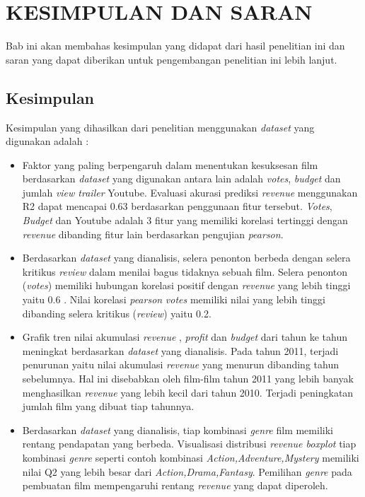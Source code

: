 \chapter{KESIMPULAN DAN SARAN}
\label{chap:kesimpulan}

Bab ini akan membahas kesimpulan yang didapat dari hasil penelitian ini dan saran yang dapat diberikan untuk pengembangan penelitian ini lebih lanjut.

\section{Kesimpulan}
Kesimpulan yang dihasilkan dari penelitian menggunakan \textit{dataset} yang digunakan adalah : 

\begin{itemize}
\item Faktor yang paling berpengaruh dalam menentukan kesuksesan film berdasarkan \textit{dataset} yang digunakan antara lain adalah \textit{votes}, \textit{budget} dan jumlah \textit{view trailer} Youtube. Evaluasi akurasi prediksi \textit{revenue} menggunakan R2 dapat mencapai 0.63 berdasarkan penggunaan fitur tersebut. \textit{Votes}, \textit{Budget} dan Youtube adalah 3 fitur yang memiliki korelasi tertinggi dengan \textit{revenue} dibanding fitur lain berdasarkan pengujian \textit{pearson}.

\item Berdasarkan \textit{dataset} yang dianalisis, selera penonton berbeda dengan selera kritikus \textit{review} dalam menilai bagus tidaknya sebuah film. Selera penonton (\textit{votes}) memiliki hubungan korelasi positif dengan \textit{revenue} yang lebih tinggi yaitu 0.6 . Nilai korelasi \textit{pearson} \textit{votes} memiliki nilai yang lebih tinggi dibanding selera kritikus (\textit{review}) yaitu 0.2. 

\item Grafik tren nilai akumulasi \textit{revenue} , \textit{profit} dan \textit{budget} dari tahun ke tahun meningkat berdasarkan \textit{dataset} yang dianalisis. Pada tahun 2011, terjadi penurunan yaitu nilai akumulasi \textit{revenue} yang menurun dibanding tahun sebelumnya. Hal ini disebabkan oleh film-film tahun 2011 yang lebih banyak menghasilkan \textit{revenue} yang lebih kecil dari tahun 2010. Terjadi peningkatan jumlah film yang dibuat tiap tahunnya.


\item Berdasarkan \textit{dataset} yang dianalisis, tiap kombinasi \textit{genre} film memiliki rentang pendapatan yang berbeda. Visualisasi distribusi \textit{revenue boxplot} tiap kombinasi \textit{genre} seperti contoh kombinasi \textit{Action,Adventure,Mystery} memiliki nilai Q2 yang lebih besar dari \textit{Action,Drama,Fantasy}. Pemilihan \textit{genre} pada pembuatan film mempengaruhi rentang \textit{revenue} yang dapat diperoleh.


\end{itemize}
